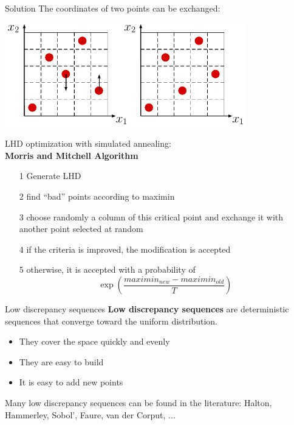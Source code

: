 \documentclass{beamer}
\begin{document}
\begin{frame}{}
\begin{exampleblock}{Solution}
The coordinates of two points can be exchanged:\\
\vspace{4mm}
\begin{center}
\includegraphics[height=4.5cm]{figures/latexdraw/lhs3}
\end{center}
\end{exampleblock}
\end{frame}

\begin{frame}{}
LHD optimization with simulated annealing:\\
\vspace{4mm}
\textbf{Morris and Mitchell Algorithm}\\
\vspace{2mm}
\begin{itemize}
	\item[1] Generate LHD
	\item[2] find ``bad'' points according to maximin
	\item[3] choose randomly a column of this critical point and exchange it with another point selected at random
	\item[4] \qquad if the criteria is improved, the modification is accepted
	\item[5] \qquad otherwise, it is accepted with a probability of $$\exp \left(\frac{maximin_{new}-maximin_{old}}{T}\right)$$
\end{itemize}
\end{frame}

\begin{frame}{Low discrepancy sequences}
\textbf{Low discrepancy sequences} are deterministic sequences that converge toward the uniform distribution.
\begin{itemize}
	\item They cover the space quickly and evenly
	\item They are easy to build
	\item It is easy to add new points
\end{itemize}
\vspace{5mm}
Many low discrepancy sequences can be found in the literature: Halton, Hammerley, Sobol', Faure, van der Corput, ...
\end{frame}
\end{document}

